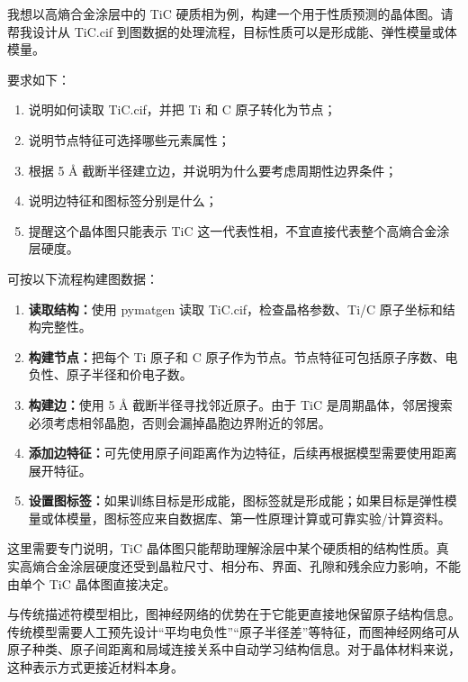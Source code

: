 \begin{samepage}
\begin{userbox}
我想以高熵合金涂层中的 TiC 硬质相为例，构建一个用于性质预测的晶体图。请帮我设计从 TiC.cif 到图数据的处理流程，目标性质可以是形成能、弹性模量或体模量。

要求如下：
\begin{enumerate}
\item 说明如何读取 TiC.cif，并把 Ti 和 C 原子转化为节点；
\item 说明节点特征可选择哪些元素属性；
\item 根据 5 \AA{} 截断半径建立边，并说明为什么要考虑周期性边界条件；
\item 说明边特征和图标签分别是什么；
\item 提醒这个晶体图只能表示 TiC 这一代表性相，不宜直接代表整个高熵合金涂层硬度。
\end{enumerate}
\end{userbox}

\begin{aibox}
可按以下流程构建图数据：

\begin{enumerate}
\item \textbf{读取结构：}使用 pymatgen 读取 TiC.cif，检查晶格参数、Ti/C 原子坐标和结构完整性。
\item \textbf{构建节点：}把每个 Ti 原子和 C 原子作为节点。节点特征可包括原子序数、电负性、原子半径和价电子数。
\item \textbf{构建边：}使用 5 \AA{} 截断半径寻找邻近原子。由于 TiC 是周期晶体，邻居搜索必须考虑相邻晶胞，否则会漏掉晶胞边界附近的邻居。
\item \textbf{添加边特征：}可先使用原子间距离作为边特征，后续再根据模型需要使用距离展开特征。
\item \textbf{设置图标签：}如果训练目标是形成能，图标签就是形成能；如果目标是弹性模量或体模量，图标签应来自数据库、第一性原理计算或可靠实验/计算资料。
\end{enumerate}

这里需要专门说明，TiC 晶体图只能帮助理解涂层中某个硬质相的结构性质。真实高熵合金涂层硬度还受到晶粒尺寸、相分布、界面、孔隙和残余应力影响，不能由单个 TiC 晶体图直接决定。
\end{aibox}
\end{samepage}

与传统描述符模型相比，图神经网络的优势在于它能更直接地保留原子结构信息。传统模型需要人工预先设计“平均电负性”“原子半径差”等特征，而图神经网络可从原子种类、原子间距离和局域连接关系中自动学习结构信息。对于晶体材料来说，这种表示方式更接近材料本身。


